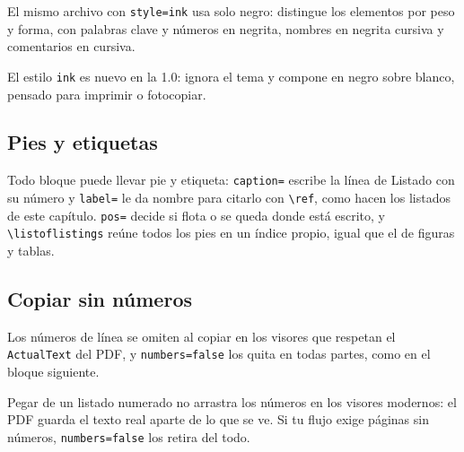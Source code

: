 El mismo archivo con \texttt{style=ink} usa solo negro: distingue los
elementos por peso y forma, con palabras clave y números en negrita,
nombres en negrita cursiva y comentarios en cursiva.

\begin{code}[lang=python, file=scripts/stats.py, lines=5-24, numbers=true, style=ink]
\end{code}

\begin{novabox}
  El estilo \texttt{ink} es nuevo en la 1.0: ignora el tema y compone en
  negro sobre blanco, pensado para imprimir o fotocopiar.
\end{novabox}

\subsection{Pies y etiquetas}

Todo bloque puede llevar pie y etiqueta: \texttt{caption=} escribe la línea
de Listado con su número y \texttt{label=} le da nombre para citarlo con
\texttt{\textbackslash ref}, como hacen los listados de este capítulo.
\texttt{pos=} decide si flota o se queda donde está escrito, y
\texttt{\textbackslash listoflistings} reúne todos los pies en un índice
propio, igual que el de figuras y tablas.

\subsection{Copiar sin números}

Los números de línea se omiten al copiar en los visores que respetan el
\texttt{ActualText} del PDF, y \texttt{numbers=false} los quita en todas
partes, como en el bloque siguiente.

\begin{code}[lang=python, file=scripts/stats.py, lines=5-24, numbers=false]
\end{code}

\begin{notebox}
  Pegar de un listado numerado no arrastra los números en los visores
  modernos: el PDF guarda el texto real aparte de lo que se ve. Si tu flujo
  exige páginas sin números, \texttt{numbers=false} los retira del todo.
\end{notebox}
